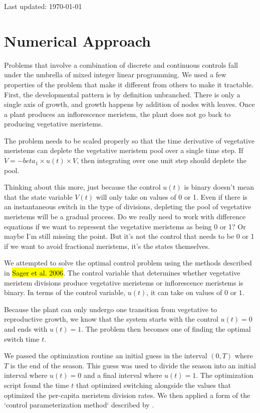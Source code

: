 \documentclass[12pt, oneside]{article}   	%
\begin{document}
 

   	Last updated: \today

\section*{Numerical Approach}

Problems that involve a combination of discrete and continuous controls fall under the umbrella of mixed integer linear programming. We used a few properties of the problem that make it different from others to make it tractable. First, the developmental pattern is by definition unbranched. There is only a single axis of growth, and growth happens by addition of nodes with leaves. Once a plant produces an inflorescence meristem, the plant does not go back to producing vegetative meristems. 

The problem needs to be scaled properly so that the time derivative of vegetative meristems can deplete the vegetative meristem pool over a single time step. If $\dot{V}=-beta_1 \times u(t) \times V$, then integrating over one unit step should deplete the pool.

Thinking about this more, just because the control $u(t)$ is binary doesn't mean that the state variable $V(t)$ will only take on values of 0 or 1. Even if there is an instantaneous switch in the type of divisions, depleting the pool of vegetative meristems will be a gradual process. Do we really need to work with difference equations if we want to represent the vegetative meristems as being 0 or 1? Or maybe I'm still missing the point. But it's not the control that needs to be 0 or 1 if we want to avoid fractional meristems, it's the states themselves.

We attempted to solve the optimal control problem using the methods described in \hl{Sager et al. 2006}. The control variable that determines whether vegetative meristem divisions produce vegetative meristems or inflorescence meristems is binary. In terms of the control variable, $u(t)$, it can take on values of $0$ or $1$. 

Because the plant can only undergo one transition from vegetative to reproductive growth, we know that the system starts with the control $u(t)=0$ and ends with $u(t)=1$. The problem then becomes one of finding the optimal switch time $t$. 

We passed the optimization routine an initial guess in the interval $(0,T)$ where $T$ is the end of the season. This guess was used to divide the season into an initial interval where $u(t)=0$ and a final interval where $u(t)=1$. The optimization script found the time $t$ that optimized switching alongside the values that optimized the per-capita meristem division rates. We then applied a form of the `control parameterization method` described by \cite{lin2014}.
 
\end{document}

